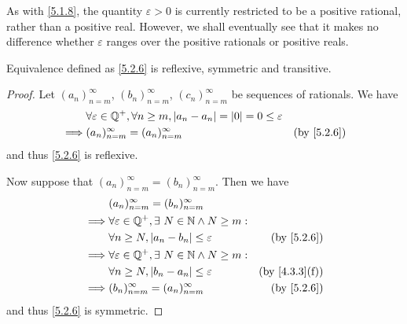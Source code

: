 \begin{rmk}\label{5.2.7}
  As with \cref{5.1.8}, the quantity \(\varepsilon > 0\) is currently restricted to be a positive rational, rather than a positive real.
  However, we shall eventually see that it makes no difference whether \(\varepsilon\) ranges over the positive rationals or positive reals.
\end{rmk}

\begin{ac}\label{ac:5.2.1}
  Equivalence defined as \cref{5.2.6} is reflexive, symmetric and transitive.
\end{ac}

\begin{proof}
  Let \((a_n)_{n = m}^\infty\), \((b_n)_{n = m}^\infty\), \((c_n)_{n = m}^\infty\) be sequences of rationals.
  We have
  \begin{align*}
             & \forall \varepsilon \in \Q^+, \forall n \geq m, \abs{a_n - a_n} = \abs{0} = 0 \leq \varepsilon                            \\
    \implies & (a_n)_{n = m}^\infty = (a_n)_{n = m}^\infty                                                    & \text{(by \cref{5.2.6})}
  \end{align*}
  and thus \cref{5.2.6} is reflexive.

  Now suppose that \((a_n)_{n = m}^\infty = (b_n)_{n = m}^\infty\).
  Then we have
  \begin{align*}
             & (a_n)_{n = m}^\infty = (b_n)_{n = m}^\infty                                                   \\
    \implies & \forall \varepsilon \in \Q^+, \exists\ N \in \N \land N \geq m:                               \\
             & \forall n \geq N, \abs{a_n - b_n} \leq \varepsilon              & \text{(by \cref{5.2.6})}    \\
    \implies & \forall \varepsilon \in \Q^+, \exists\ N \in \N \land N \geq m:                               \\
             & \forall n \geq N, \abs{b_n - a_n} \leq \varepsilon              & \text{(by \cref{4.3.3}(f))} \\
    \implies & (b_n)_{n = m}^\infty = (a_n)_{n = m}^\infty                     & \text{(by \cref{5.2.6})}
  \end{align*}
  and thus \cref{5.2.6} is symmetric.


\end{proof}
